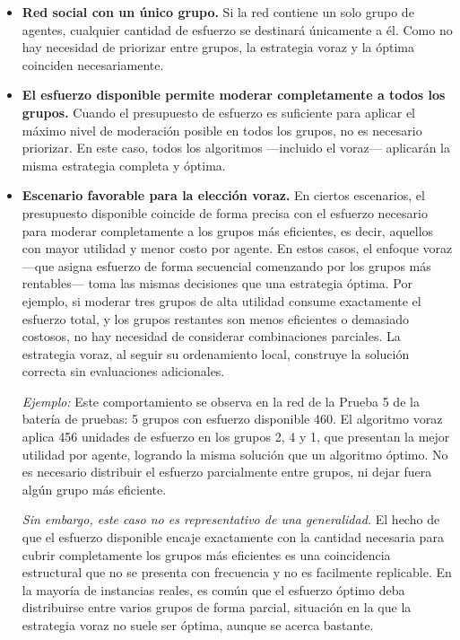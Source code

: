 \documentclass[11pt,letter]{article}
\begin{document}
    \begin{itemize}
        \item \textbf{Red social con un único grupo.}  
        Si la red contiene un solo grupo de agentes, cualquier cantidad de esfuerzo se destinará únicamente a él. Como no hay necesidad de priorizar entre grupos, la estrategia voraz y la óptima coinciden necesariamente.

    
        \item \textbf{El esfuerzo disponible permite moderar completamente a todos los grupos.}  
        Cuando el presupuesto de esfuerzo es suficiente para aplicar el máximo nivel de moderación posible en todos los grupos, no es necesario priorizar. En este caso, todos los algoritmos —incluido el voraz— aplicarán la misma estrategia completa y óptima.
  
    \item \textbf{Escenario favorable para la elección voraz.}  
En ciertos escenarios, el presupuesto disponible coincide de forma precisa con el esfuerzo necesario para moderar completamente a los grupos más eficientes, es decir, aquellos con mayor utilidad y menor costo por agente. En estos casos, el enfoque voraz —que asigna esfuerzo de forma secuencial comenzando por los grupos más rentables— toma las mismas decisiones que una estrategia óptima. Por ejemplo, si moderar tres grupos de alta utilidad consume exactamente el esfuerzo total, y los grupos restantes son menos eficientes o demasiado costosos, no hay necesidad de considerar combinaciones parciales. La estrategia voraz, al seguir su ordenamiento local, construye la solución correcta sin evaluaciones adicionales.

\textit{Ejemplo:} Este comportamiento se observa en la red de la Prueba 5 de la batería de pruebas: 5 grupos con esfuerzo disponible 460. El algoritmo voraz aplica 456 unidades de esfuerzo en los grupos 2, 4 y 1, que presentan la mejor utilidad por agente, logrando la misma solución que un algoritmo óptimo. No es necesario distribuir el esfuerzo parcialmente entre grupos, ni dejar fuera algún grupo más eficiente.

\textit{Sin embargo, este caso no es representativo de una generalidad.} El hecho de que el esfuerzo disponible encaje exactamente con la cantidad necesaria para cubrir completamente los grupos más eficientes es una coincidencia estructural que no se presenta con frecuencia y no es facilmente replicable. En la mayoría de instancias reales, es común que el esfuerzo óptimo deba distribuirse entre varios grupos de forma parcial, situación en la que la estrategia voraz no suele ser óptima, aunque se acerca bastante.

    \end{itemize}
\end{document}
